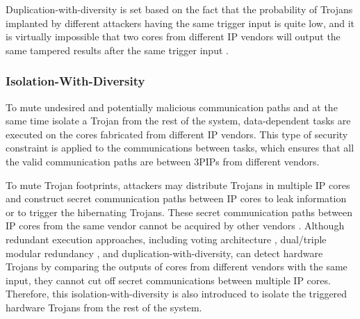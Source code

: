 \documentclass[10pt,journal, compsoc]{IEEEtran}
\begin{document}
Duplication-with-diversity is set based on the fact that the probability of Trojans implanted by different attackers having the same trigger input is quite low, and it is virtually impossible that two cores from different IP vendors will output the same tampered results after the same trigger input \cite{article:NV}.%




\subsubsection{Isolation-With-Diversity}

To mute undesired and potentially malicious communication paths and at the same time isolate a Trojan from the rest of the system, data-dependent tasks are executed on the cores fabricated from different IP vendors. This type of security constraint is applied to the communications between tasks, which ensures that all the valid communication paths are between 3PIPs from different vendors.


To mute Trojan footprints, attackers may distribute Trojans in multiple IP cores and construct secret communication paths between IP cores to leak information or to trigger the hibernating Trojans. These secret communication paths between IP cores from the same vendor cannot be acquired by other vendors \cite{article:JR3}. Although redundant execution approaches, including voting architecture \cite{conference:MB}, dual/triple modular redundancy \cite{conference:DG}, and duplication-with-diversity, can detect hardware Trojans by comparing the outputs of cores from different vendors with the same input, they cannot cut off secret communications between multiple IP cores. Therefore, this isolation-with-diversity is also introduced to isolate the triggered hardware Trojans from the rest of the system.
\end{document}
